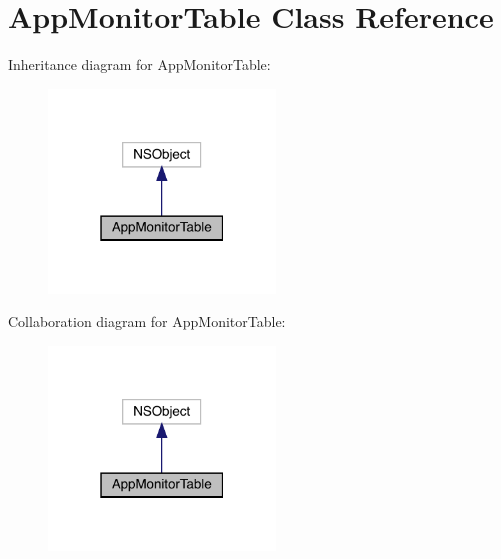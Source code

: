\hypertarget{interface_app_monitor_table}{}\section{App\+Monitor\+Table Class Reference}
\label{interface_app_monitor_table}


Inheritance diagram for App\+Monitor\+Table\+:\nopagebreak
\begin{figure}[H]
\begin{center}
\leavevmode
\includegraphics[width=171pt]{interface_app_monitor_table__inherit__graph}
\end{center}
\end{figure}


Collaboration diagram for App\+Monitor\+Table\+:\nopagebreak
\begin{figure}[H]
\begin{center}
\leavevmode
\includegraphics[width=171pt]{interface_app_monitor_table__coll__graph}
\end{center}
\end{figure}
